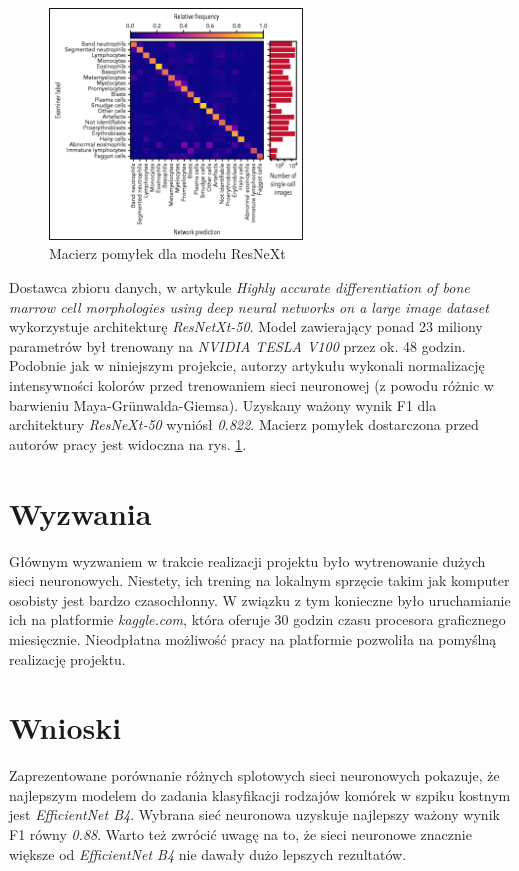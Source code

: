 \begin{figure}
    \centering
    \includegraphics[width=0.6\textwidth]{images/resnext_confusion_matrix}
    \caption{Macierz pomyłek dla modelu ResNeXt \cite{resnext}}
    \label{fig:resnext_confusion_matrix}
\end{figure}

Dostawca zbioru danych, w artykule \textit{Highly accurate differentiation of bone marrow cell morphologies using deep neural networks on a large image dataset}~\cite{resnext} wykorzystuje architekturę \textit{ResNetXt-50}.
Model zawierający ponad 23 miliony parametrów był trenowany na \textit{NVIDIA TESLA V100} przez ok. 48 godzin.
Podobnie jak w niniejszym projekcie, autorzy artykułu wykonali normalizację intensywności kolorów przed trenowaniem sieci neuronowej (z powodu różnic w barwieniu Maya-Grünwalda-Giemsa).
Uzyskany ważony wynik F1 dla architektury \textit{ResNeXt-50} wyniósł \textit{0.822}.
Macierz pomyłek dostarczona przed autorów pracy jest widoczna na rys. \ref{fig:resnext_confusion_matrix}.


\section{Wyzwania}

Głównym wyzwaniem w trakcie realizacji projektu było wytrenowanie dużych sieci neuronowych.
Niestety, ich trening na lokalnym sprzęcie takim jak komputer osobisty jest bardzo czasochłonny.
W związku z tym konieczne było uruchamianie ich na platformie \textit{kaggle.com}, która oferuje 30 godzin czasu procesora graficznego miesięcznie.
Nieodpłatna możliwość pracy na platformie pozwoliła na pomyślną realizację projektu.


\section{Wnioski}

Zaprezentowane porównanie różnych splotowych sieci neuronowych pokazuje, że najlepszym modelem do zadania klasyfikacji rodzajów komórek w szpiku kostnym jest \textit{EfficientNet B4}.
Wybrana sieć neuronowa uzyskuje najlepszy ważony wynik F1 równy \textit{0.88}.
Warto też zwrócić uwagę na to, że sieci neuronowe znacznie większe od \textit{EfficientNet B4} nie dawały dużo lepszych rezultatów.

